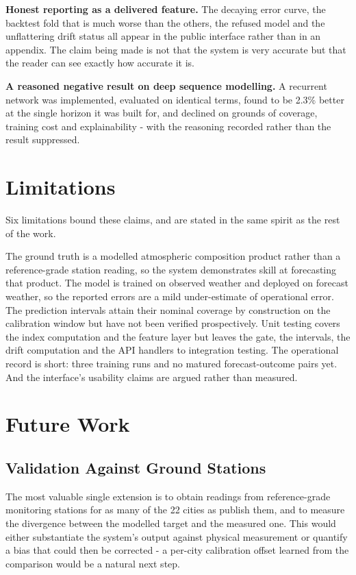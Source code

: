 \textbf{Honest reporting as a delivered feature.} The decaying error curve, the
backtest fold that is much worse than the others, the refused model and the
unflattering drift status all appear in the public interface rather than in an
appendix. The claim being made is not that the system is very accurate but that
the reader can see exactly how accurate it is.

\textbf{A reasoned negative result on deep sequence modelling.} A recurrent
network was implemented, evaluated on identical terms, found to be 2.3\% better at
the single horizon it was built for, and declined on grounds of coverage, training
cost and explainability - with the reasoning recorded rather than the result
suppressed.

\section{Limitations}
Six limitations bound these claims, and are stated in the same spirit as the rest
of the work.

The ground truth is a modelled atmospheric composition product rather than a
reference-grade station reading, so the system demonstrates skill at forecasting
that product. The model is trained on observed weather and deployed on forecast
weather, so the reported errors are a mild under-estimate of operational error.
The prediction intervals attain their nominal coverage by construction on the
calibration window but have not been verified prospectively. Unit testing covers
the index computation and the feature layer but leaves the gate, the intervals,
the drift computation and the API handlers to integration testing. The operational
record is short: three training runs and no matured forecast-outcome pairs yet.
And the interface's usability claims are argued rather than measured.

\section{Future Work}

\subsection{Validation Against Ground Stations}
The most valuable single extension is to obtain readings from reference-grade
monitoring stations for as many of the 22 cities as publish them, and to measure
the divergence between the modelled target and the measured one. This would either
substantiate the system's output against physical measurement or quantify a bias
that could then be corrected - a per-city calibration offset learned from the
comparison would be a natural next step.

